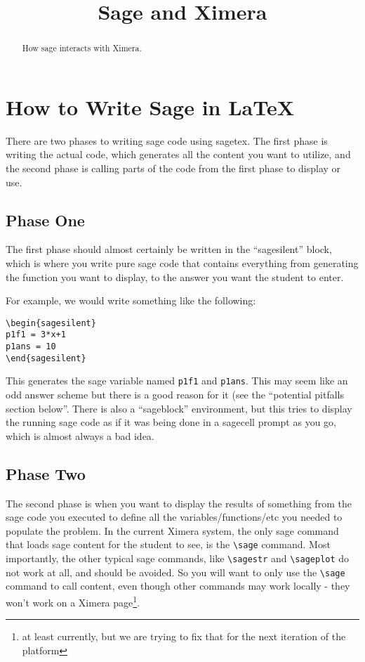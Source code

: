 \documentclass{ximera}
\title{Sage and Ximera}
\begin{document}
\begin{abstract}
     How sage interacts with Ximera.
\end{abstract}
\maketitle


\section{How to Write Sage in LaTeX}

There are two phases to writing sage code using sagetex. The first phase is writing the actual code, which generates all the content you want to utilize, and the second phase is calling parts of the code from the first phase to display or use.

\subsection{Phase One}

The first phase should almost certainly be written in the ``sagesilent'' block, which is where you write pure sage code that contains everything from generating the function you want to display, to the answer you want the student to enter.

For example, we would write something like the following:
\begin{verbatim}
\begin{sagesilent}
p1f1 = 3*x+1
p1ans = 10
\end{sagesilent}
\end{verbatim}
This generates the sage variable named \verb|p1f1| and \verb|p1ans|. This may seem like an odd answer scheme but there is a good reason for it (see the ``potential pitfalls section below''. There is also a ``sageblock'' environment, but this tries to display the running sage code as if it was being done in a sagecell prompt as you go, which is almost always a bad idea.

\subsection{Phase Two}

The second phase is when you want to display the results of something from the sage code you executed to define all the variables/functions/etc you needed to populate the problem. In the current Ximera system, the only sage command that loads sage content for the student to see, is the \verb|\sage| command. Most importantly, the other typical sage commands, like \verb|\sagestr| and \verb|\sageplot| do not work at all, and should be avoided. So you will want to only use the \verb|\sage| command to call content, even though other commands may work locally - they won't work on a Ximera page\footnote{at least currently, but we are trying to fix that for the next iteration of the platform}.
\end{document}
